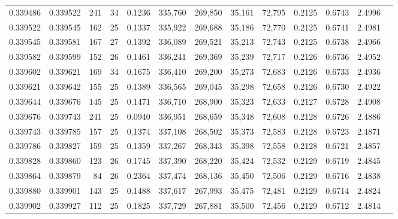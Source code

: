 \begin{tabular}{rrrrrrrrrrrrr}
0.339486 & 0.339522 &   241 &  34 &                                     0.1236 & 335,760 & 269,850 &  35,161 &  72,795 & 0.2125 & 0.6743 & 2.4996 \\
0.339522 & 0.339545 &   162 &  25 &                                     0.1337 & 335,922 & 269,688 &  35,186 &  72,770 & 0.2125 & 0.6741 & 2.4981 \\
0.339545 & 0.339581 &   167 &  27 &                                     0.1392 & 336,089 & 269,521 &  35,213 &  72,743 & 0.2125 & 0.6738 & 2.4966 \\
0.339582 & 0.339599 &   152 &  26 &                                     0.1461 & 336,241 & 269,369 &  35,239 &  72,717 & 0.2126 & 0.6736 & 2.4952 \\
0.339602 & 0.339621 &   169 &  34 &                                     0.1675 & 336,410 & 269,200 &  35,273 &  72,683 & 0.2126 & 0.6733 & 2.4936 \\
0.339621 & 0.339642 &   155 &  25 &                                     0.1389 & 336,565 & 269,045 &  35,298 &  72,658 & 0.2126 & 0.6730 & 2.4922 \\
0.339644 & 0.339676 &   145 &  25 &                                     0.1471 & 336,710 & 268,900 &  35,323 &  72,633 & 0.2127 & 0.6728 & 2.4908 \\
0.339676 & 0.339743 &   241 &  25 &                                     0.0940 & 336,951 & 268,659 &  35,348 &  72,608 & 0.2128 & 0.6726 & 2.4886 \\
0.339743 & 0.339785 &   157 &  25 &                                     0.1374 & 337,108 & 268,502 &  35,373 &  72,583 & 0.2128 & 0.6723 & 2.4871 \\
0.339786 & 0.339827 &   159 &  25 &                                     0.1359 & 337,267 & 268,343 &  35,398 &  72,558 & 0.2128 & 0.6721 & 2.4857 \\
0.339828 & 0.339860 &   123 &  26 &                                     0.1745 & 337,390 & 268,220 &  35,424 &  72,532 & 0.2129 & 0.6719 & 2.4845 \\
0.339864 & 0.339879 &    84 &  26 &                                     0.2364 & 337,474 & 268,136 &  35,450 &  72,506 & 0.2129 & 0.6716 & 2.4838 \\
0.339880 & 0.339901 &   143 &  25 &                                     0.1488 & 337,617 & 267,993 &  35,475 &  72,481 & 0.2129 & 0.6714 & 2.4824 \\
0.339902 & 0.339927 &   112 &  25 &                                     0.1825 & 337,729 & 267,881 &  35,500 &  72,456 & 0.2129 & 0.6712 & 2.4814 \\

\end{tabular}
